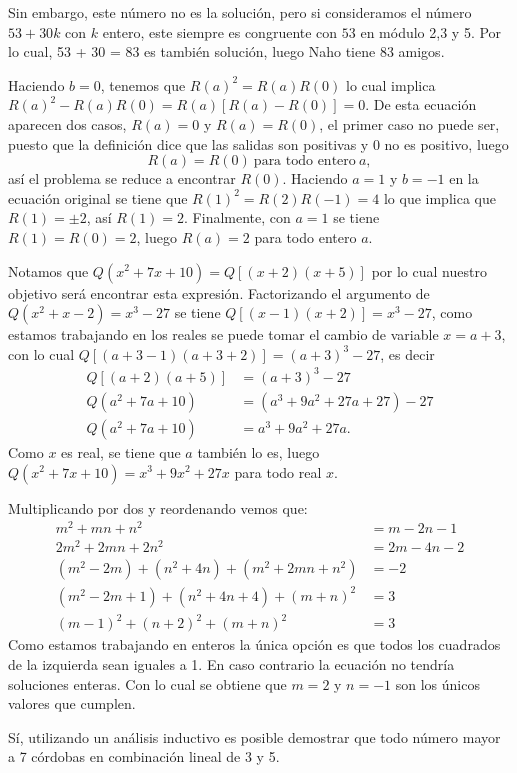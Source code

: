 \begin{solution}[(Problema 7)]
    Sin embargo, este número no es la solución, pero si consideramos el número $53 + 30k$ con $k$ entero, este siempre es congruente con $53$ en módulo 2,3 y 5.
    Por lo cual, 53 + 30 = 83 es también solución, luego Naho tiene 83 amigos.
\end{solution}

\begin{solution}[(Problema 8)]
    Haciendo $b = 0$, tenemos que $R(a)^2 = R(a)R(0)$ lo cual implica $R(a)^2 - R(a)R(0) = R(a)\left[R(a) - R(0)\right] = 0$.
    De esta ecuación aparecen dos casos, $R(a) = 0$ y $R(a) = R(0)$, el primer caso no puede ser, puesto que la definición dice que las
    salidas son positivas y 0 no es positivo, luego
    \[
        R(a) = R(0)\ \text{para todo entero}\ a,
    \]
    así el problema se reduce a encontrar $R(0)$.
    Haciendo $a = 1$ y $b = -1$ en la ecuación original se tiene que $R(1)^2 = R(2)R(-1) = 4$ lo que implica que $R(1) = \pm 2$, así $R(1) = 2$.
    Finalmente, con $a = 1$ se tiene $R(1) = R(0) = 2$, luego $R(a) = 2$ para todo entero $a$.
\end{solution}
\newpage
\begin{solution}[(Problema 9)]
    Notamos que $Q(x^2 + 7x + 10) = Q\left[(x + 2)(x + 5)\right]$ por lo cual nuestro objetivo será encontrar esta expresión.
    Factorizando el argumento de $Q(x^2 + x - 2) = x^3 - 27$ se tiene $Q\left[(x - 1)(x + 2)\right] = x^3 - 27$, como estamos trabajando en los reales
    se puede tomar el cambio de variable $x = a + 3$, con lo cual $Q\left[(a + 3 - 1)(a + 3 + 2)\right] = (a + 3)^3 - 27$, es decir
    \begin{align*}
        Q\left[(a + 2)(a + 5)\right] &= (a + 3)^3 - 27\\
        Q(a^2 + 7a + 10) &= (a^3 + 9a^2 + 27a + 27) - 27\\
        Q(a^2 + 7a + 10) &= a^3 + 9a^2 + 27a.
    \end{align*}
    Como $x$ es real, se tiene que $a$ también lo es, luego $Q(x^2 + 7x + 10) = x^3 + 9x^2 + 27x$ para todo real $x$.
\end{solution}

\begin{solution}[(Problema 10)]
    Multiplicando por dos y reordenando vemos que:
    \begin{align*}
        m^2 + mn + n^2 &= m - 2n - 1\\
        2m^2 + 2mn + 2n^2 &= 2m - 4n - 2\\
        (m^2 - 2m) + (n^2 + 4n) + (m^2 + 2mn + n^2) &= -2\\
        (m^2 - 2m + 1) + (n^2 + 4n + 4) + (m + n)^2 &= 3\\
        (m - 1)^2 + (n + 2)^2 + (m + n)^2 &= 3
    \end{align*}
    Como estamos trabajando en enteros la única opción es que todos los cuadrados de la izquierda sean iguales a 1.
    En caso contrario la ecuación no tendría soluciones enteras.
    Con lo cual se obtiene que $m = 2$ y $n = -1$ son los únicos valores que cumplen.
\end{solution}

\begin{solution}[(Problema 11)]
    Sí, utilizando un análisis inductivo es posible demostrar que todo número mayor a 7 córdobas en combinación lineal de 3 y 5.
\end{solution}
